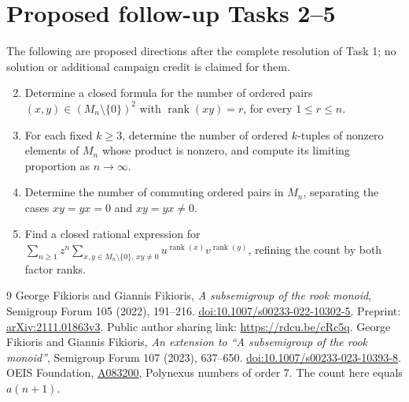 \documentclass[11pt]{article}
\begin{document}
\section*{Proposed follow-up Tasks 2--5}
The following are proposed directions after the complete resolution of
Task 1; no solution or additional campaign credit is claimed for them.
\begin{enumerate}
\setcounter{enumi}{1}
\item Determine a closed formula for the number of ordered pairs
$(x,y)\in(M_n\setminus\{0\})^2$ with $\operatorname{rank}(xy)=r$,
for every $1\le r\le n$.
\item For each fixed $k\ge3$, determine the number of ordered
$k$-tuples of nonzero elements of $M_n$ whose product is nonzero,
and compute its limiting proportion as $n\to\infty$.
\item Determine the number of commuting ordered pairs in $M_n$,
separating the cases $xy=yx=0$ and $xy=yx\ne0$.
\item Find a closed rational expression for
$\sum_{n\ge1}z^n\sum_{x,y\in M_n\setminus\{0\},\,xy\ne0}
u^{\operatorname{rank}(x)}v^{\operatorname{rank}(y)}$,
refining the count by both factor ranks.
\end{enumerate}

\begin{thebibliography}{9}
 George Fikioris and Giannis Fikioris,
\emph{A subsemigroup of the rook monoid}, Semigroup Forum
105 (2022), 191--216.
\href{https://doi.org/10.1007/s00233-022-10302-5}{doi:10.1007/s00233-022-10302-5}.
Preprint: \href{https://arxiv.org/abs/2111.01863v3}{arXiv:2111.01863v3}.
Public author sharing link: \url{https://rdcu.be/cRc5q}.
 George Fikioris and Giannis Fikioris,
\emph{An extension to ``A subsemigroup of the rook monoid''},
Semigroup Forum 107 (2023), 637--650.
\href{https://doi.org/10.1007/s00233-023-10393-8}{doi:10.1007/s00233-023-10393-8}.
 OEIS Foundation, \href{https://oeis.org/A083200}{A083200},
Polynexus numbers of order 7. The count here equals $a(n+1)$.
\end{thebibliography}
\end{document}
